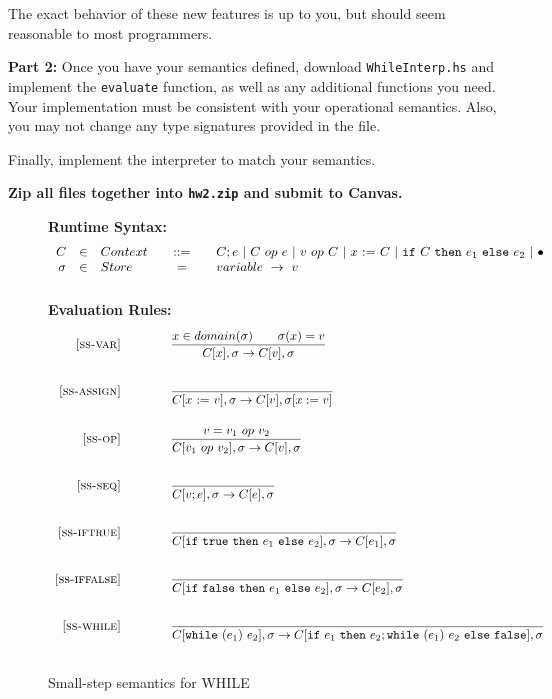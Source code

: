 \documentclass{article}
\begin{document}
The exact behavior of these new features is up to you,
but should seem reasonable to most programmers.

\bigskip
\noindent
{\bf Part 2:}
Once you have your semantics defined,
download {\tt WhileInterp.hs} and implement the {\tt evaluate} function,
as well as any additional functions you need.
Your implementation must be consistent with your operational semantics.
Also, you may not change any type signatures provided in the file.

Finally, implement the interpreter to match your semantics.

\bigskip
\noindent
{\bf Zip all files together into {\tt hw2.zip} and submit to Canvas.}





\begin{figure}[H]\label{fig:smallstep}
\caption{Small-step semantics for WHILE}
{\bf Runtime Syntax:}
\[
\begin{array}{rclcl}
  C & \in & {Context} \quad & ::= & \quad C; e
        ~|~ C ~op~ e
        ~|~ v ~op~ C
        ~|~ x~{:=}~C
        ~|~ \mbox{\tt if}~{C}~\mbox{\tt then}~{e_1}~\mbox{\tt else}~{e_2}
        ~|~ \bullet \\
  \sigma & \in & {Store} \quad  & = & \quad {variable} ~\rightarrow ~v \\
  \\
\end{array}
\]
{\bf Evaluation Rules:~~~ } \\
\[
\begin{array}{r@{\qquad\qquad}l}
\ssrule{ss-var}{
  x \in domain(\sigma) \qquad \sigma(x)=v
}{
  \sstep{x}{\sigma}{v}{\sigma}
}
\ssrule{ss-assign}{
}{
  \sstep{\assign{x}{v}}{\sigma}{v}{\sigma[x:=v]}
}
\ssrule{ss-op}{
  v = v_1 ~op~ v_2
}{
  \sstep{v_1~op~v_2}{\sigma}{v}{\sigma}
}
\ssrule{ss-seq}{
}{
  \sstep{v;e}{\sigma}{e}{\sigma}
}
\ssrule{ss-iftrue}{
}{
  \sstep{\ife{\true}{e_1}{e_2}}{\sigma}{e_1}{\sigma}
}
\ssrule{ss-iffalse}{
}{
  \sstep{\ife{\false}{e_1}{e_2}}{\sigma}{e_2}{\sigma}
}
\ssrule{ss-while}{
}{
  \sstep{\whilee{e_1}{e_2}}{\sigma}{\ife{e_1}{e_2;\whilee{e_1}{e_2}}{\false}}{\sigma}
}
\end{array}
\]
\end{figure}
\end{document}

